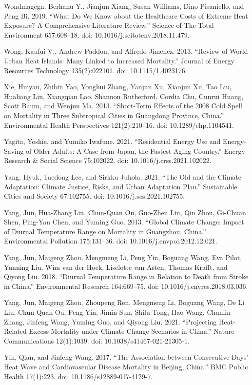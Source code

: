 \documentclass[12pt]{article}
\begin{document}
Wondmagegn, Berhanu Y., Jianjun Xiang, Susan Williams, Dino Pisaniello,
and Peng Bi. 2019. ``What Do We Know about the Healthcare Costs of
Extreme Heat Exposure? A Comprehensive Literature Review.'' Science of
The Total Environment 657:608--18. doi: 10.1016/j.scitotenv.2018.11.479.

Wong, Kaufui V., Andrew Paddon, and Alfredo Jimenez. 2013. ``Review of
World Urban Heat Islands: Many Linked to Increased Mortality.'' Journal
of Energy Resources Technology 135(2):022101. doi: 10.1115/1.4023176.

Xie, Huiyan, Zhibin Yao, Yonghui Zhang, Yanjun Xu, Xiaojun Xu, Tao Liu,
Hualiang Lin, Xiangqian Lao, Shannon Rutherford, Cordia Chu, Cunrui
Huang, Scott Baum, and Wenjun Ma. 2013. ``Short-Term Effects of the 2008
Cold Spell on Mortality in Three Subtropical Cities in Guangdong
Province, China.'' Environmental Health Perspectives 121(2):210--16.
doi: 10.1289/ehp.1104541.

Yagita, Yoshie, and Yumiko Iwafune. 2021. ``Residential Energy Use and
Energy-Saving of Older Adults: A Case from Japan, the Fastest-Aging
Country.'' Energy Research \& Social Science 75:102022. doi:
10.1016/j.erss.2021.102022.

Yang, Hyuk, Taedong Lee, and Sirkku Juhola. 2021. ``The Old and the
Climate Adaptation: Climate Justice, Risks, and Urban Adaptation Plan.''
Sustainable Cities and Society 67:102755. doi:
10.1016/j.scs.2021.102755.

Yang, Jun, Hua-Zhang Liu, Chun-Quan Ou, Guo-Zhen Lin, Qin Zhou, Gi-Chuan
Shen, Ping-Yan Chen, and Yuming Guo. 2013. ``Global Climate Change:
Impact of Diurnal Temperature Range on Mortality in Guangzhou, China.''
Environmental Pollution 175:131--36. doi: 10.1016/j.envpol.2012.12.021.

Yang, Jun, Maigeng Zhou, Mengmeng Li, Peng Yin, Boguang Wang, Eva Pilot,
Yunning Liu, Wim van der Hoek, Liselotte van Asten, Thomas Krafft, and
Qiyong Liu. 2018. ``Diurnal Temperature Range in Relation to Death from
Stroke in China.'' Environmental Research 164:669--75. doi:
10.1016/j.envres.2018.03.036.

Yang, Jun, Maigeng Zhou, Zhoupeng Ren, Mengmeng Li, Boguang Wang, De Li
Liu, Chun-Quan Ou, Peng Yin, Jimin Sun, Shilu Tong, Hao Wang, Chunlin
Zhang, Jinfeng Wang, Yuming Guo, and Qiyong Liu. 2021. ``Projecting
Heat-Related Excess Mortality under Climate Change Scenarios in China.''
Nature Communications 12(1):1039. doi: 10.1038/s41467-021-21305-1.

Yin, Qian, and Jinfeng Wang. 2017. ``The Association between Consecutive
Days' Heat Wave and Cardiovascular Disease Mortality in Beijing,
China.'' BMC Public Health 17(1):223. doi: 10.1186/s12889-017-4129-7.
\end{document}
